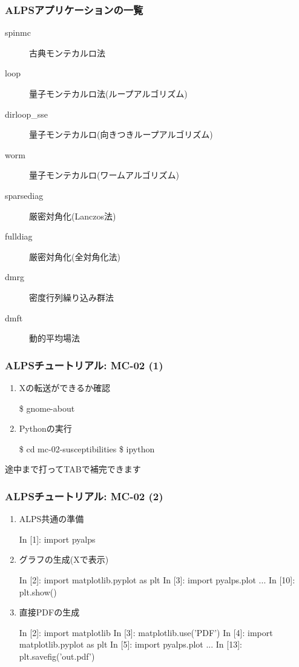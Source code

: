 \begin{frame}
  \frametitle{ALPSアプリケーションの一覧}
  \begin{description}
  \item[spinmc] 古典モンテカルロ法
  \item[loop] 量子モンテカルロ法(ループアルゴリズム)
  \item[dirloop\_sse] 量子モンテカルロ(向きつきループアルゴリズム)
  \item[worm] 量子モンテカルロ(ワームアルゴリズム)
  \item[sparsediag] 厳密対角化(Lanczos法)
  \item[fulldiag] 厳密対角化(全対角化法)
  \item[dmrg] 密度行列繰り込み群法
  \item[dmft] 動的平均場法
  \end{description}
\end{frame}

\begin{frame}[fragile]
  \frametitle{ALPSチュートリアル: MC-02 (1)}
  \begin{enumerate}
  \item<1-> Xの転送ができるか確認
\begin{semiverbatim}
 \$ gnome-about
\end{semiverbatim}
  \item<1-> Pythonの実行
\begin{semiverbatim}
 \$ cd mc-02-susceptibilities
 \$ ipython
\end{semiverbatim}
  \end{enumerate}
  \begin{center}
    \begin{alertblock}{}
      途中まで打ってTABで補完できます
    \end{alertblock}
  \end{center}
\end{frame}

\begin{frame}[fragile,shrink=5]
  \frametitle{ALPSチュートリアル: MC-02 (2)}
  \begin{enumerate}
  \item<2-> ALPS共通の準備
\begin{semiverbatim}
In [1]: import pyalps
\end{semiverbatim}
  \item<3-> グラフの生成(Xで表示)
\begin{semiverbatim}
In [2]: import matplotlib.pyplot as plt
In [3]: import pyalps.plot
...
In [10]: plt.show()
\end{semiverbatim}
  \item<3-> 直接PDFの生成
\begin{semiverbatim}
In [2]: import matplotlib
In [3]: matplotlib.use('PDF')
In [4]: import matplotlib.pyplot as plt
In [5]: import pyalps.plot
...
In [13]: plt.savefig('out.pdf')
\end{semiverbatim}
  \end{enumerate}
\end{frame}

